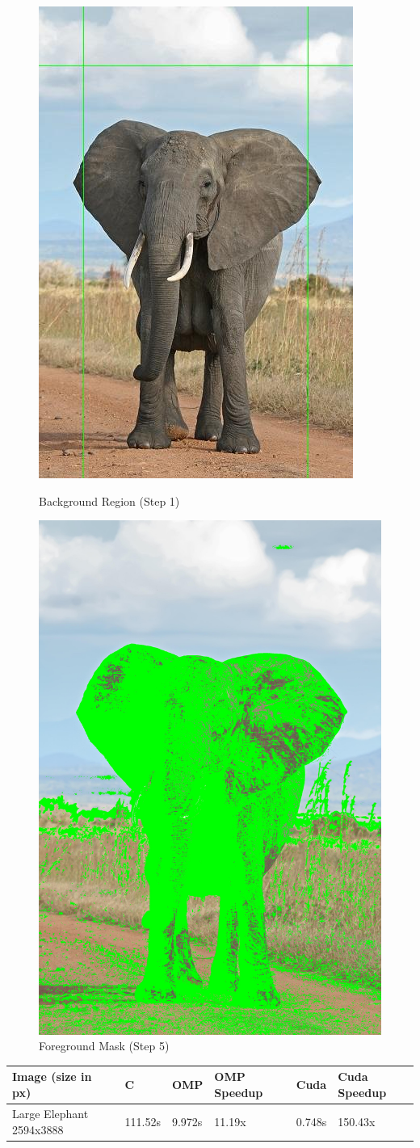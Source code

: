 \documentclass[12pt]{article}
\begin{document}
\begin{figure}[!htb]
    \begin{minipage}{0.48\textwidth}
        \centering
        \includegraphics[width=0.5\linewidth]{border.jpg}
        \caption{Background Region (Step 1)}
    \end{minipage}\hfill
    \begin{minipage}{0.48\textwidth}
        \centering
        \includegraphics[width=0.5\linewidth]{mask.jpg}
        \caption{Foreground Mask (Step 5)}
    \end{minipage}\hfill
\end{figure}

\begin{tabular}{l|l|l|l|l|l}
    Image (size in px) & C & OMP & OMP Speedup & Cuda & Cuda Speedup \\
    \hline
    Large Elephant 2594x3888 & 111.52s & 9.972s & 11.19x & 0.748s & 150.43x \\
\end{tabular}
\end{document}
